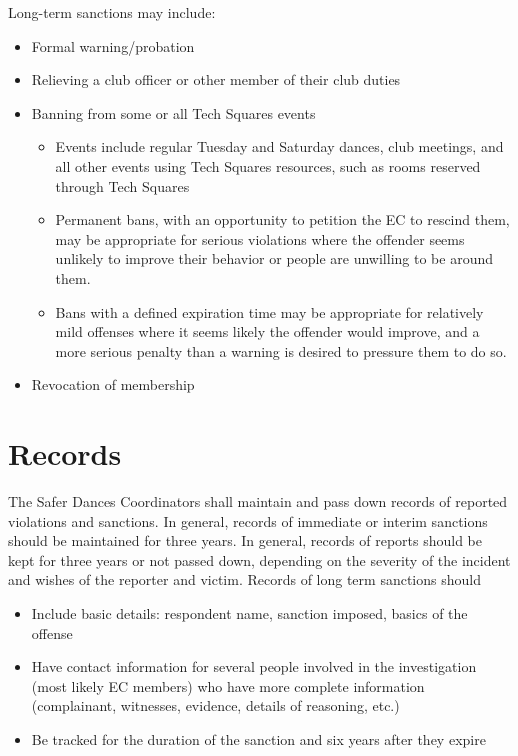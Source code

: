 \documentclass{article}
\begin{document}
Long-term sanctions may include:
\begin{itemize}
\item Formal warning/probation
\item Relieving a club officer or other member of their club duties
\item Banning from some or all Tech Squares events
    \begin{itemize}
    \item Events include regular Tuesday and Saturday dances, club meetings, and all other events using Tech Squares resources, such as rooms reserved through Tech Squares
    \item Permanent bans, with an opportunity to petition the EC to rescind them, may be appropriate for serious violations where the offender seems unlikely to improve their behavior or people are unwilling to be around them.
    \item Bans with a defined expiration time may be appropriate for relatively mild offenses where it seems likely the offender would improve, and a more serious penalty than a warning is desired to pressure them to do so.
    \end{itemize}
\item Revocation of membership
\end{itemize}


\section{Records}

The Safer Dances Coordinators shall maintain and pass down records of reported violations and sanctions. In general, records of immediate or interim sanctions should be maintained for three years. In general, records of reports should be kept for three years or not passed down, depending on the severity of the incident and wishes of the reporter and victim. Records of long term sanctions should

\begin{itemize}
\item Include basic details: respondent name, sanction imposed, basics of the offense
\item Have contact information for several people involved in the investigation (most likely EC members) who have more complete information (complainant, witnesses, evidence, details of reasoning, etc.)
\item Be tracked for the duration of the sanction and six years after they expire
\end{itemize}
\end{document}
